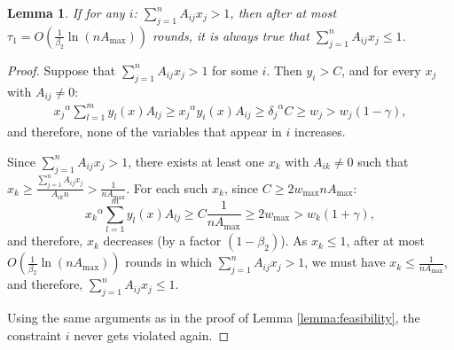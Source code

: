 \documentclass[11pt]{article}
\newtheorem{lemma}[theorem]{Lemma}
\begin{document}
\begin{lemma}\label{lemma:self-stabilization}
If for any $i$: $\sum_{j=1}^n A_{ij}x_j > 1$, then after at most $\tau_1 = O(\frac{1}{\beta_2}\ln(nA_{\max}))$ rounds, it is always true that $\sum_{j=1}^n A_{ij}x_j \leq 1$.
\end{lemma}
\begin{proof}
Suppose that $\sum_{j=1}^n A_{ij}x_j > 1$ for some $i$. Then $y_i > C$, and for every $x_j$ with $A_{ij}\neq 0$:
\begin{align*}
{x_j}^{\alpha}\sum_{l=1}^m y_l(x)A_{lj} \geq {x_j}^{\alpha}y_i(x)A_{ij}\geq {\delta_j}^{\alpha}C \geq w_j>w_j(1-\gamma),
\end{align*}
and therefore, none of the variables that appear in $i$ increases.

Since $\sum_{j=1}^n A_{ij}x_j > 1$, there exists at least one $x_k$ with $A_{ik}\neq 0$ such that $x_k \geq \frac{\sum_{j=1}^n A_{ij}x_j}{A_{ik}n}>\frac{1}{nA_{\max}}$. For each such $x_k$, since $C\geq 2w_{\max}nA_{\max}$:
\begin{equation*}
{x_k}^{\alpha}\sum_{l=1}^m y_l(x)A_{lj}\geq C\frac{1}{nA_{\max}}\geq 2 w_{\max} > w_k(1+\gamma),  
\end{equation*}
and therefore, $x_k$ decreases (by a factor $(1-\beta_2)$). As $x_k\leq 1$, after at most $O(\frac{1}{\beta_2}\ln(nA_{\max}))$ rounds in which $\sum_{j=1}^n A_{ij}x_j > 1$, we must have $x_k \leq \frac{1}{nA_{\max}}$, and therefore, $\sum_{j=1}^n A_{ij}x_j \leq 1$.
 
Using the same arguments as in the proof of Lemma \ref{lemma:feasibility}, the constraint $i$ never gets violated again.
\end{proof}
\end{document}
